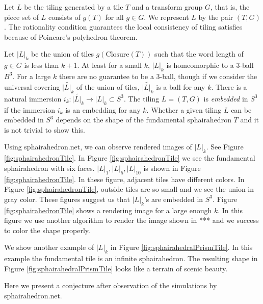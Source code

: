 \documentclass[suppldata, dvipdfmx]{interact}
\theoremstyle{plain}%
\theoremstyle{definition}
\theoremstyle{remark}
\theoremstyle{problemstyle}
\begin{document}
Let $L$ be the tiling generated by a tile $T$ and a transform group $G$, that is, the piece set of $L$ consists of $g(T)$ for all $g\in G$.  We represent $L$ by the pair $(T,G)$.  The rationality condition guarantees the local consistency of tiling satisfies because of Poincare's polyhedron theorem.  

Let $|L|_k$ be the union of tiles $g(\text{Closure}(T))$ such that the word length of $g\in G$ is less than $k+1$.  At least for a small $k$, $|L|_k$ is homeomorphic to a 3-ball $B^3$.  For a large $k$ there are no guarantee to be a 3-ball, though if we consider the universal covering $\widetilde{|L|_k}$ of the union of tiles, $\widetilde{|L|_k}$ is a ball for any $k$.  There is a natural immersion $i_k:\widetilde{|L|_k}\to|L|_k\subset S^3$.  The tiling $L=(T,G)$ is {\it embedded} in $S^3$ if the immersion $i_k$ is an embedding for any $k$.  Whether a given tiling $L$ can be embedded in $S^3$ depends on the shape of the fundamental sphairahedron $T$ and it is not trivial to show this.  

Using sphairahedron.net\cite{sphairahedron_net}, we can observe rendered images of $|L|_k$.  See Figure \ref{fig:sphairahedronTile}.   In Figure
\ref{fig:sphairahedronTile} we see the fundamental sphairahedron with six faces.  $|L|_1, |L|_5, |L|_{10}$ is shown in Figure
\ref{fig:sphairahedronTile}.  In these figure, adjacent tiles have different colors.  In Figure \ref{fig:sphairahedronTile}, outside tiles are so small and we see the union in gray color.  These figures suggest us that $|L|_k$'s are embedded in $S^3$.  Figure \ref{fig:sphairahedronTile} shows a rendering image for a large enough $k$.  In this figure we use another algorithm to render the image shown in *** and we success to color the shape properly.

We show another example of $|L|_k$ in Figure \ref{fig:sphairahedralPrismTile}.  In this example the fundamental tile is an infinite sphairahedron.  The resulting shape in Figure \ref{fig:sphairahedralPrismTile} looks like a terrain of scenic beauty.

Here we present a conjecture after observation of the simulations by sphairahedron.net\cite{sphairahedron_net}.
\end{document}
